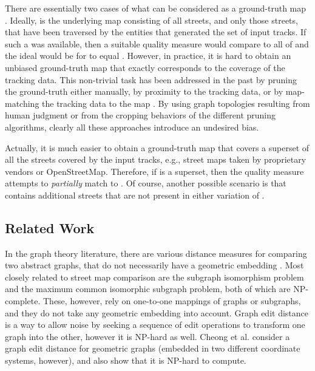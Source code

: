 \documentclass[natbib]{svjour3}                    \smartqed  \usepackage[table]{xcolor}
\begin{document}
There are essentially two cases of what can be considered as a ground-truth map . Ideally,  is the underlying map consisting of all streets, and only those streets, that have been traversed by the entities that generated the set of input tracks. If such a  was available, then a suitable quality measure would compare  to all of  and the ideal would be for  to equal . However, in practice, it is hard to obtain an unbiased ground-truth map that exactly corresponds to the coverage of the tracking data. 
This non-trivial task has been addressed in the past by pruning the ground-truth either manually, by proximity to the tracking data, or by map-matching the tracking data to the map \cite{be-irmgp-12,Biagioni:2012:MIF:2424321.2424333,Karagiorgou:2012:VTD:2424321.2424334,Liu:2012:MLS:2339530.2339637}. By using graph topologies resulting from human judgment or from the cropping behaviors of the different pruning algorithms, clearly all these approaches introduce an undesired bias.

Actually, it is much easier to obtain a ground-truth map that covers a superset of all the streets covered by the input tracks, e.g., street maps taken by proprietary vendors or OpenStreetMap. 
Therefore, if  is a superset, then the quality measure attempts to {\em partially} match  to .
Of course, another possible scenario is that  contains additional streets that are not present in either variation of . 

\subsection{Related Work}
In the graph theory literature, there are various distance measures for comparing two abstract graphs, that do not necessarily have a geometric embedding \cite{cfsv-tygmpr-04,JGT:JGT3190030202,JGT:JGT3190010410}. Most closely related to street map comparison are the subgraph isomorphism problem and the maximum common isomorphic subgraph problem, both of which are NP-complete. These, however, rely on one-to-one mappings of graphs or subgraphs, and they do not take any geometric embedding into account. Graph edit distance \cite{gxtl-sged-10,Zeng:2009:CSA:1687627.1687631} is a way to allow noise by seeking a sequence of edit operations to transform one graph into the other, however it is NP-hard as well. Cheong et al. \cite{CheongGKSS09} consider a graph edit distance for geometric graphs (embedded in two different coordinate systems, however), and also show that it is NP-hard to compute. 
\end{document}

